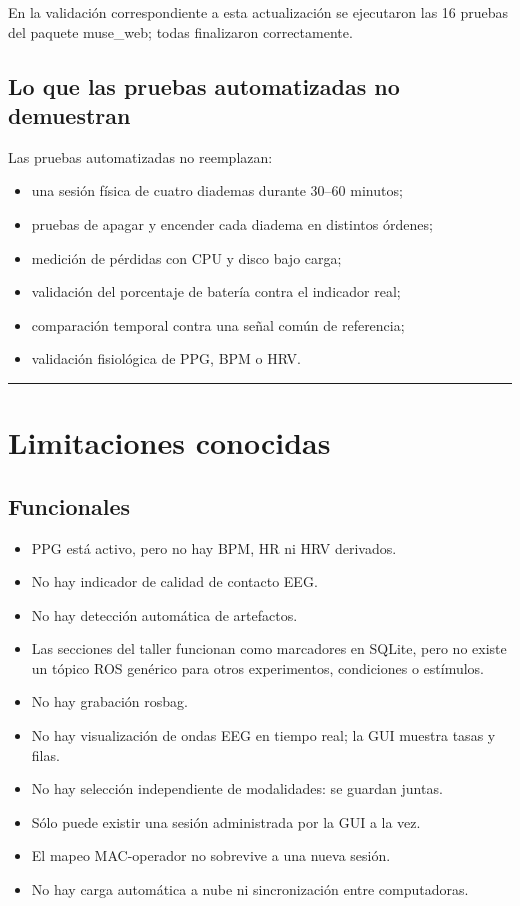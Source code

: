 \documentclass[11pt,a4paper]{article}
\begin{document}
En la validación correspondiente a esta actualización se ejecutaron las 16 pruebas del
paquete {\ttfamily\small muse\_web}; todas finalizaron correctamente.

\subsection{Lo que las pruebas automatizadas no demuestran}

Las pruebas automatizadas no reemplazan:

\begin{itemize}
\item una sesión física de cuatro diademas durante 30–60 minutos;
\item pruebas de apagar y encender cada diadema en distintos órdenes;
\item medición de pérdidas con CPU y disco bajo carga;
\item validación del porcentaje de batería contra el indicador real;
\item comparación temporal contra una señal común de referencia;
\item validación fisiológica de PPG, BPM o HRV.
\end{itemize}

\medskip\hrule\medskip

\section{Limitaciones conocidas}

\subsection{Funcionales}

\begin{itemize}
\item PPG está activo, pero no hay BPM, HR ni HRV derivados.
\item No hay indicador de calidad de contacto EEG.
\item No hay detección automática de artefactos.
\item Las secciones del taller funcionan como marcadores en SQLite, pero no existe un
tópico ROS genérico para otros experimentos, condiciones o estímulos.
\item No hay grabación {\ttfamily\small rosbag}.
\item No hay visualización de ondas EEG en tiempo real; la GUI muestra tasas y filas.
\item No hay selección independiente de modalidades: se guardan juntas.
\item Sólo puede existir una sesión administrada por la GUI a la vez.
\item El mapeo MAC-operador no sobrevive a una nueva sesión.
\item No hay carga automática a nube ni sincronización entre computadoras.
\end{itemize}
\end{document}
